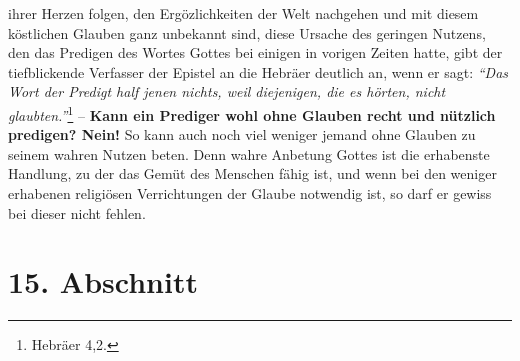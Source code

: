 ihrer Herzen folgen, den Ergözlichkeiten der Welt nachgehen und mit diesem
köstlichen Glauben ganz unbekannt sind, diese Ursache des geringen Nutzens, den
das Predigen des Wortes Gottes bei einigen in vorigen Zeiten
hatte, gibt der
tiefblickende Verfasser der Epistel an die Hebräer
deutlich an, wenn er sagt:
\textit{"`Das Wort der Predigt half jenen nichts, weil
diejenigen, die es hörten, nicht glaubten."'}\footnote{Hebräer 4,2.}
\label{ref:06_14_predigt}
-- \textbf{Kann
ein
Prediger wohl ohne Glauben recht und nützlich predigen? Nein!} So kann auch noch
viel weniger jemand ohne Glauben zu seinem wahren Nutzen beten. Denn wahre
Anbetung Gottes ist die erhabenste Handlung, zu der das Gemüt des Menschen fähig
ist, und wenn bei den weniger erhabenen religiösen Verrichtungen der Glaube
notwendig ist, so darf er gewiss bei dieser nicht fehlen.

\section{15. Abschnitt} \label{kap6_ab15}

